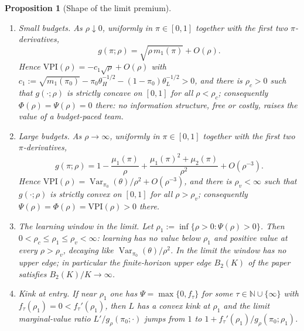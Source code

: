 \documentclass[11pt]{article}
\newtheorem{proposition}{Proposition}
\theoremstyle{definition}
\theoremstyle{remark}
\newcommand{\VPI}{\mathrm{VPI}}
\DeclareMathOperator{\Var}{Var}
\begin{document}
\begin{proposition}[Shape of the limit premium]\label{prop:shape}
\begin{enumerate}
\item[(a)] \emph{Small budgets.} As $\rho\downarrow0$, uniformly in $\pi\in[0,1]$ together with the first two
$\pi$-derivatives,
\[
g(\pi;\rho)=\sqrt{\rho\,m_1(\pi)}+O(\rho).
\]
Hence $\VPI(\rho)=-c_1\sqrt\rho+O(\rho)$ with
$c_1:=\sqrt{m_1(\pi_0)}-\pi_0\theta_H^{-1/2}-(1-\pi_0)\theta_L^{-1/2}>0$, and there is $\rho_c>0$ such that
$g(\cdot;\rho)$ is strictly concave on $[0,1]$ for all $\rho<\rho_c$; consequently $\Phi(\rho)=\Psi(\rho)=0$ there:
no information structure, free or costly, raises the value of a budget-paced team.
\item[(b)] \emph{Large budgets.} As $\rho\to\infty$, uniformly in $\pi\in[0,1]$ together with the first two
$\pi$-derivatives,
\[
g(\pi;\rho)=1-\frac{\mu_1(\pi)}{\rho}+\frac{\mu_1(\pi)^2+\mu_2(\pi)}{\rho^{2}}+O(\rho^{-3}).
\]
Hence $\VPI(\rho)=\Var_{\pi_0}(\theta)/\rho^2+O(\rho^{-3})$, and there is $\rho_v<\infty$ such that $g(\cdot;\rho)$ is strictly
convex on $[0,1]$ for all $\rho>\rho_v$; consequently $\Psi(\rho)=\Phi(\rho)=\VPI(\rho)>0$ there.
\item[(c)] \emph{The learning window in the limit.} Let $\rho_1:=\inf\{\rho>0:\Psi(\rho)>0\}$. Then
$0<\rho_c\le\rho_1\le\rho_v<\infty$: learning has no value below $\rho_1$ and positive value at every $\rho>\rho_v$,
decaying like $\Var_{\pi_0}(\theta)/\rho^2$. In the limit the window has no upper edge; in particular the
finite-horizon upper edge $B_2(K)$ of the paper satisfies $B_2(K)/K\to\infty$.
\item[(d)] \emph{Kink at entry.} If near $\rho_1$ one has $\Psi=\max\{0,f_\tau\}$ for some
$\tau\in\mathbb N\cup\{\infty\}$ with $f_\tau(\rho_1)=0<f_\tau'(\rho_1)$, then $L$ has a convex kink at $\rho_1$ and
the limit marginal-value ratio $L'/g_\rho(\pi_0;\cdot)$ jumps from $1$ to $1+f_\tau'(\rho_1)/g_\rho(\pi_0;\rho_1)$.
\end{enumerate}
\end{proposition}
\end{document}
